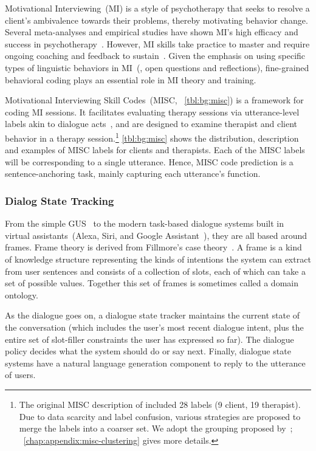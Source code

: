 Motivational Interviewing~(MI) is a style of psychotherapy that seeks
to resolve a client's ambivalence towards their problems, thereby
motivating behavior change. Several meta-analyses and empirical
studies have shown MI's high efficacy and success in
psychotherapy~\citep{burke2004emerging, martins2009review,
  lundahl2010meta}. However, MI skills take practice to master and
require ongoing coaching and feedback to sustain~\citep{Schwalbe2014}.
Given the emphasis on using specific types of linguistic behaviors in
MI~(\eg, open questions and reflections), fine-grained behavioral
coding plays an essential role in MI theory and training.

Motivational Interviewing Skill Codes~(MISC, ~\autoref{tbl:bg:misc})
is a framework for coding MI sessions. It facilitates evaluating
therapy sessions via utterance-level labels akin to dialogue
acts~\citep{stolcke2000dialogue,jurafsky2018speech}, and are designed
to examine therapist and client behavior in a therapy
session.\footnote{The original MISC description of
  \citet{miller2003manual} included 28 labels (9 client, 19
  therapist). Due to data scarcity and label confusion, various
  strategies are proposed to merge the labels into a coarser set.  We
  adopt the grouping proposed by~\citet{xiao2016behavioral};
  ~\autoref{chap:appendix:misc-clustering} gives more details.}
\autoref{tbl:bg:misc} shows the distribution, description and examples
of MISC labels for clients and therapists. Each of the MISC labels
will be corresponding to a single utterance. Hence, MISC code
prediction is a sentence-anchoring task, mainly capturing each
utterance's function.

\subsubsection{Dialog State Tracking}
\label{ssec:bg:dialogue-state}
From the simple GUS~\citep{bobrow1977gus} to the modern task-based
dialogue systems built in virtual assistants~(Alexa, Siri, and Google
Assistant~\etal), they are all based around frames. Frame theory is
derived from Fillmore's case theory~\citep{Fillmore:68}. A frame is a
kind of knowledge structure representing the kinds of intentions the
system can extract from user sentences and consists of a collection of
slots, each of which can take a set of possible values. Together this
set of frames is sometimes called a domain ontology.

As the dialogue goes on, a dialogue state tracker maintains the
current state of the conversation (which includes the user's most recent
dialogue intent, plus the entire set of slot-filler constraints the
user has expressed so far). The dialogue policy decides what the
system should do or say next. Finally, dialogue state systems have a
natural language generation component to reply to the utterance of users.

